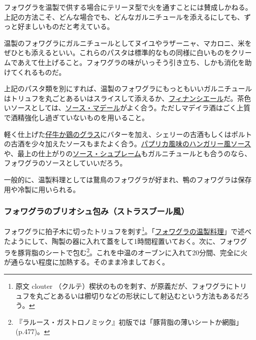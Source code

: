 フォワグラを温製で供する場合にテリーヌ型で火を通すことには賛成しかねる。上記の方法こそ、どんな場合でも、どんなガルニチュールを添えるにしても、ずっと好ましいものだと考えている。

温製のフォワグラにガルニチュールとしてヌイユやラザーニャ、マカロニ、米をぜひとも添えるといい。これらのパスタは標準的なもの同様に白いものをクリームであえて仕上げること。フォワグラの味がいっそう引き立ち、しかも消化を助けてくれるものだ。

上記のパスタ類を別にすれば、温製のフォワグラにもっともいいガルニチュールはトリュフを丸ごとあるいはスライスして添えるか、\protect\hyperlink{garniture-a-la-financiere}{フィナンシエール}だ。茶色いソースとしては、\protect\hyperlink{sauce-madere}{ソース・マデール}がよく合う。ただしマデイラ酒はごく上質で酒精強化し過ぎていないものを用いること。

軽く仕上げた\protect\hyperlink{glaces-diverses}{仔牛か鶏のグラス}にバターを加え、シェリーの古酒もしくはポルトの古酒を少々加えたソースもまたよく合う。\protect\hyperlink{sauce-hongroise}{パプリカ風味のハンガリー風ソース}や、最上の仕上がりの\protect\hyperlink{sauce-supreme}{ソース・シュプレーム}もガルニチュールとも合うのなら、フォワグラのソースとしていいだろう。

一般的に、温製料理としては鵞鳥のフォワグラが好まれ、鴨のフォワグラは保存用や冷製に用いられる。

\hypertarget{foie-gras-cuit-dans-une-brioche}{%
\subsubsection{フォワグラのブリオシュ包み（ストラスブール風）}\label{foie-gras-cuit-dans-une-brioche}}



フォワグラに拍子木に切ったトリュフを刺す\footnote{原文 clouter
  （クルテ）楔状のものを刺す、が原義だが、フォワグラにトリュフを丸ごとあるいは櫛切りなどの形状にして射込むという方法もあるだろう。}。「\protect\hyperlink{preparations-chaudes-du-foie-gras}{フォワグラの温製料理}」で述べたようにして、陶製の器に入れて蓋をして1時間程置いておく。次に、フォワグラを豚背脂のシートで包む\footnote{『ラルース・ガストロノミック』初版では「豚背脂の薄いシートか網脂」(p.477)。}。これを中温のオーブンに入れて20分間、完全に火が通らない程度に加熱する。そのまま冷ましておく。


